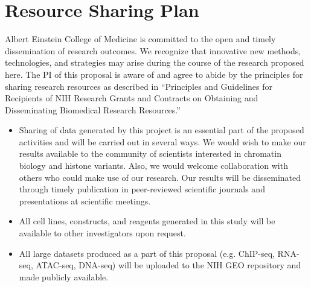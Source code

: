 
\section{Resource Sharing Plan}
Albert Einstein College of Medicine is committed to the open and timely dissemination of research outcomes. 
We recognize that innovative new methods, technologies, and strategies may arise during the course of the research proposed here.
The PI of this proposal is aware of and agree to abide by the principles for sharing research resources as described in \enquote{Principles and Guidelines for Recipients of NIH Research Grants and Contracts on Obtaining and Disseminating Biomedical Research Resources.}

\begin{itemize}
	\item Sharing of data generated by this project is an essential part of the proposed activities and will be carried out in several ways. 
	We would wish to make our results available to the community of scientists interested in chromatin biology and histone variants. 
	Also, we would welcome collaboration with others who could make use of our research.
	Our results will be disseminated through timely publication in peer-reviewed scientific journals and presentations at scientific meetings.
	
	\item All cell lines, constructs, and reagents generated in this study will be available to other investigators upon request.
	
	\item All large datasets produced as a part of this proposal (e.g. ChIP-seq, RNA-seq, ATAC-seq, DNA-seq) will be uploaded to the NIH GEO repository and made publicly available. 
\end{itemize}
	
